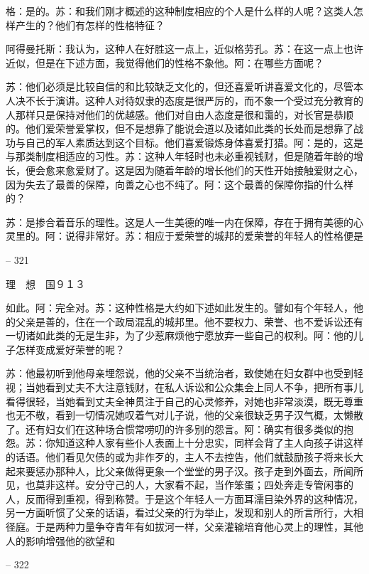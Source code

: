 \documentclass[11pt,oneside]{book}
\begin{document}
\begin{common-format}
    格：是的。苏：和我们刚才概述的这种制度相应的个人是什么样的人呢？这类人怎样产生的？他们有怎样的性格特征？

    阿得曼托斯：我认为，这种人在好胜这一点上，近似格劳孔。苏：在这一点上也许近似，但是在下述方面，我觉得他们的性格不象他。阿：在哪些方面呢？

    苏：他们必须是比较自信的和比较缺乏文化的，但还喜爱听讲喜爱文化的，尽管本人决不长于演讲。这种人对待奴隶的态度是很严厉的，而不象一个受过充分教育的人那样只是保持对他们的优越感。他们对自由人态度是很和霭的，对长官是恭顺的。他们爱荣誉爱掌权，但不是想靠了能说会道以及诸如此类的长处而是想靠了战功与自己的军人素质达到这个目标。他们喜爱锻炼身体喜爱打猎。阿：是的，这是与那类制度相适应的习性。苏：这种人年轻时也未必重视钱财，但是随着年龄的增长，便会愈来愈爱财了。这是因为随着年龄的增长他们的天性开始接触爱财之心，因为失去了最善的保障，向善之心也不纯了。阿：这个最善的保障你指的什么样的？

    苏：是掺合着音乐的理性。这是人一生美德的唯一内在保障，存在于拥有美德的心灵里的。阿：说得非常好。苏：相应于爱荣誉的城邦的爱荣誉的年轻人的性格便是

    

-- 321

    理　想　国９１３

    如此。阿：完全对。苏：这种性格是大约如下述如此发生的。譬如有个年轻人，他的父亲是善的，住在一个政局混乱的城邦里。他不要权力、荣誉、也不爱诉讼还有一切诸如此类的无是生非，为了少惹麻烦他宁愿放弃一些自己的权利。阿：他的儿子怎样变成爱好荣誉的呢？

    苏：他最初听到他母亲埋怨说，他的父亲不当统治者，致使她在妇女群中也受到轻视；当她看到丈夫不大注意钱财，在私人诉讼和公众集会上同人不争，把所有事儿看得很轻，当她看到丈夫全神贯注于自己的心灵修养，对她也非常淡漠，既无尊重也无不敬，看到一切情况她叹着气对儿子说，他的父亲很缺乏男子汉气概，太懒散了。还有妇女们在这种场合惯常唠叨的许多别的怨言。阿：确实有很多类似的抱怨。苏：你知道这种人家有些仆人表面上十分忠实，同样会背了主人向孩子讲这样的话语。他们看见欠债的或为非作歹的，主人不去控告，他们就鼓励孩子将来长大起来要惩办那种人，比父亲做得更象一个堂堂的男子汉。孩子走到外面去，所闻所见，也莫非这样。安分守己的人，大家看不起，当作笨蛋；四处奔走专管闲事的人，反而得到重视，得到称赞。于是这个年轻人一方面耳濡目染外界的这种情况，另一方面听惯了父亲的话语，看过父亲的行为举止，发现和别人的所言所行，大相径庭。于是两种力量争夺青年有如拔河一样，父亲灌输培育他心灵上的理性，其他人的影响增强他的欲望和

    

-- 322


\end{common-format}
\end{document}
